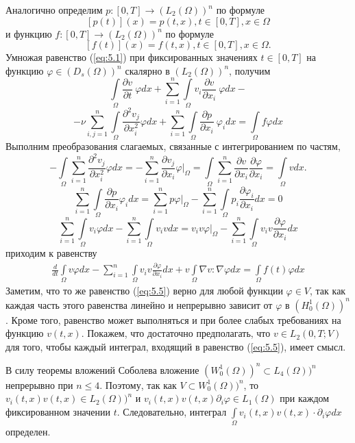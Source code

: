 Аналогично определим $p:[0,T]\rightarrow (L_2(\Omega))^n$ по формуле $$[p(t)](x)=p(t,x), t\in[0,T],
x\in\Omega$$ и функцию $f:[0,T]\rightarrow (L_2(\Omega))^n$ по формуле $$[f(t)](x)=f(t,x), t\in[0,T], x\in\Omega.$$
Умножая равенство (\ref{eq:5.1}) при фиксированных значениях $t\in [0,T]$ на функцию $\varphi\in (D_s(\Omega))^n$ скалярно в $(L_2(\Omega))^n$, получим
$$\int\limits_\Omega \frac{\partial v}{\partial t}\ \varphi dx+\sum_{i=1}^n\int\limits_\Omega v_i\frac{\partial v}{\partial x_i}\ \varphi dx-$$
$$-\nu \sum_{i,j=1}^n\int\limits_\Omega\frac{\partial^2 v_j}{\partial x^{2}_i} \varphi dx+\sum_{i=1}^n\int\limits_\Omega \frac{\partial p}{\partial x_i}\ \varphi_idx=\int\limits_\Omega f\varphi dx$$
Выполним преобразования слагаемых, связанные с интегрированием по частям,
$$-\int\limits_\Omega \sum_{i=1}^{n}\frac{\partial^2 v_j}{\partial x^{2}_i}\varphi dx=-\sum_{i=1}^{n}\frac{\partial v_j}{\partial x_i}\varphi \bigg|_\Omega
=\int\limits_\Omega\sum_{i=1}^{n}\frac{\partial v}{\partial x_i}\frac{\partial \varphi}{\partial x_i}=\int\limits_\Omega v dx .$$
$$\sum_{i=1}^{n}\int\limits_\Omega \frac{\partial p}{\partial x_i}\varphi_i dx
=\sum_{i=1}^{n}p\varphi \bigg|_{\Omega}-\sum_{i=1}^{n}\int\limits_\Omega p_i\frac{\partial \varphi_i}{\partial x_i}dx=0$$
$$\sum_{i=1}^{n}\int\limits_\Omega v_i\varphi dx-\sum_{i=1}^{n}\int\limits_\Omega v_i v dx
=v_i v \varphi \bigg|_{\Omega}-\sum_{i=1}^{n}\int\limits_\Omega v_i v \frac{\partial \varphi}{\partial x_i}dx$$
приходим к равенству
\begin{equation}\label{eq:5.5}
    \begin{gathered}
        \frac{d}{dt}\int\limits_\Omega v \varphi dx-\sum_{i=1}^{n}\int\limits_\Omega v_i v
        \frac{\partial \varphi }{\partial x_i}dx + v\int\limits_\Omega \nabla v :\nabla\varphi dx
        =\int\limits_\Omega f(t)\varphi dx
    \end{gathered}
\end{equation}
Заметим, что то же равенство (\ref{eq:5.5}) верно для любой функции $\varphi\in V$, так как каждая часть этого равенства линейно и непрерывно зависит от
$\varphi$ в $(H^{1}_{0}(\Omega))^n$. Кроме того, равенство может выполняться и при более слабых требованиях на функцию $v(t,x)$.
Покажем, что достаточно предполагать, что $v\in L_2(0,T;V)$ для того, чтобы каждый интеграл, входящий в равенство (\ref{eq:5.5}), имеет смысл.

В силу теоремы вложений Соболева вложение $(W^{1}_{0}(\Omega))^n\subset L_4(\Omega))^n$ непрерывно при $n\leqslant4$.
Поэтому, так как $V\subset W^{1}_{0}(\Omega))^n$, то $v_i(t,x)v(t,x)\in L_2(\Omega))^n$ и $v_i(t,x)v(t,x)\partial_i\varphi \in L_1(\Omega)$
при каждом фиксированном значении $t$. Следовательно, интеграл $\int\limits_\Omega v_i(t,x)v(t,x)\cdot\partial_i\varphi dx$ определен.


